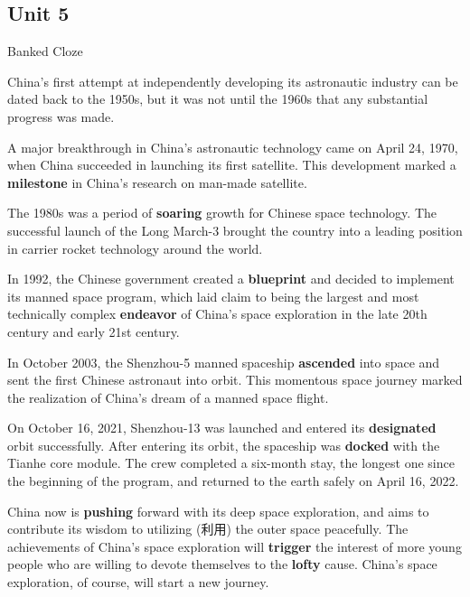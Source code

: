 \newpage

\subsection{Unit 5}

\begin{question}{Banked Cloze}

China's first attempt at independently developing its astronautic industry can be dated back to the 1950s, but it was not until the 1960s that any substantial progress was made.

\vspace{1em}

A major breakthrough in China's astronautic technology came on April 24, 1970, when China succeeded in launching its first satellite. This development marked a \textbf{\color{red} milestone} in China's research on man-made satellite.

\vspace{1em}

The 1980s was a period of \textbf{\color{red} soaring} growth for Chinese space technology. The successful launch of the Long March-3 brought the country into a leading position in carrier rocket technology around the world.

\vspace{1em}

In 1992, the Chinese government created a \textbf{\color{red} blueprint} and decided to implement its manned space program, which laid claim to being the largest and most technically complex \textbf{\color{red} endeavor} of China's space exploration in the late 20th century and early 21st century.

\vspace{1em}

In October 2003, the Shenzhou-5 manned spaceship \textbf{\color{red} ascended} into space and sent the first Chinese astronaut into orbit. This momentous space journey marked the realization of China's dream of a manned space flight.

\vspace{1em}

On October 16, 2021, Shenzhou-13 was launched and entered its \textbf{\color{red} designated} orbit successfully. After entering its orbit, the spaceship was 
\textbf{\color{red} docked} with the Tianhe core module. The crew completed a six-month stay, the longest one since the beginning of the program, and returned to the earth safely on April 16, 2022.

\vspace{1em}

China now is \textbf{\color{red} pushing} forward with its deep space exploration, and aims to contribute its wisdom to utilizing (利用) the outer space peacefully. The achievements of China's space exploration will
\textbf{\color{red} trigger} the interest of more young people who are willing to devote themselves to the 
\textbf{\color{red} lofty} cause. China's space exploration, of course, will start a new journey.

\end{question}

